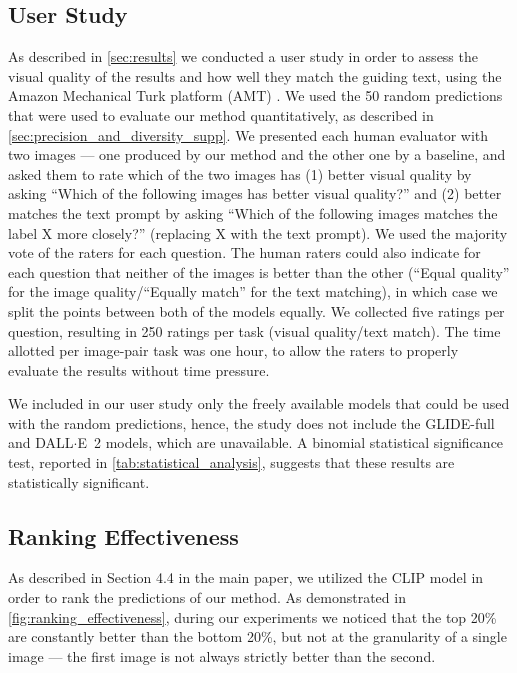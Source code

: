 \begin{appendix}
\subsection{User Study} As described in
\ref{sec:results}
we conducted a user study in order to assess the visual quality of the results and how well they match the guiding text, using the Amazon Mechanical Turk platform (AMT) \cite{amt_website}. We used the 50 random predictions that were used to evaluate our method quantitatively, as described in \ref{sec:precision_and_diversity_supp}. We presented each human evaluator with two images --- one produced by our method and the other one by a baseline, and asked them to rate which of the two images has (1) better visual quality by asking ``Which of the following images has better visual quality?'' and (2) better matches the text prompt by asking ``Which of the following images matches the label X more closely?'' (replacing X with the text prompt). We used the majority vote of the raters for each question. The human raters could also indicate for each question that neither of the images is better than the other (``Equal quality'' for the image quality/``Equally match'' for the text matching), in which case we split the points between both of the models equally. We collected five ratings per question, resulting in 250 ratings per task (visual quality/text match). The time allotted per image-pair task was one hour, to allow the raters to properly evaluate the results without time pressure. 

We included in our user study only the freely available models that could be used with the random predictions, hence, the study does not include the GLIDE-full \cite{nichol2021glide} and {DALL$\cdot$E}~2 \cite{ramesh2022hierarchical} models, which are unavailable. A binomial statistical significance test, reported in \ref{tab:statistical_analysis}, suggests that these results are statistically significant.

\subsection{Ranking Effectiveness}

As described in Section 4.4 in the main paper, we utilized the CLIP model in order to rank the predictions of our method. As demonstrated in \ref{fig:ranking_effectiveness}, during our experiments we noticed that the top 20\% are constantly better than the bottom 20\%, but not at the granularity of a single image --- the first image is not always strictly better than the second.


\end{appendix}
